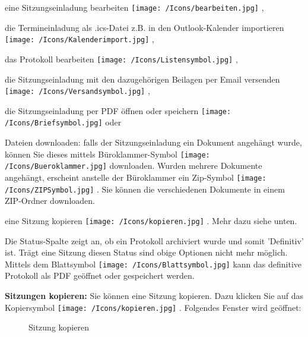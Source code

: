\begin{compactitem}
	\item eine Sitzungseinladung bearbeiten \texttt{[image: /Icons/bearbeiten.jpg]} ,
	\item die Termineinladung als .ics-Datei z.B. in den Outlook-Kalender importieren \texttt{[image: /Icons/Kalenderimport.jpg]} ,
	\item das Protokoll bearbeiten \texttt{[image: /Icons/Listensymbol.jpg]} ,
	\item die Sitzungseinladung mit den dazugehörigen Beilagen per Email versenden \texttt{[image: /Icons/Versandsymbol.jpg]} ,
	\item die Sitzungseinladung per PDF öffnen oder speichern \texttt{[image: /Icons/Briefsymbol.jpg]}  oder
	\item Dateien downloaden: falls der Sitzungseinladung ein Dokument angehängt wurde, können Sie dieses mittels Büroklammer-Symbol \texttt{[image: /Icons/Bueroklammer.jpg]}  downloaden. Wurden mehrere Dokumente angehängt, erscheint anstelle der Büroklammer ein Zip-Symbol \texttt{[image: /Icons/ZIPSymbol.jpg]} . Sie können die verschiedenen Dokumente in einem ZIP-Ordner downloaden.
	\item eine Sitzung kopieren \texttt{[image: /Icons/kopieren.jpg]} . Mehr dazu siehe unten.
	\end{compactitem}
	
Die Status-Spalte  zeigt an, ob ein Protokoll archiviert wurde und somit 'Definitiv' ist. Trägt eine Sitzung diesen Status sind obige Optionen nicht mehr möglich. Mittels dem Blattsymbol \texttt{[image: /Icons/Blattsymbol.jpg]} kann das definitive Protokoll als PDF geöffnet oder gespeichert werden.
	
\vspace{\baselineskip}
\label{bkm:Ref2017112701}

\textbf{Sitzungen kopieren:} Sie können eine Sitzung kopieren. Dazu klicken Sie auf das Kopiersymbol \texttt{[image: /Icons/kopieren.jpg]} . Folgendes Fenster wird geöffnet: 

\begin{figure}[H]
\caption{Sitzung kopieren}
\end{figure}

